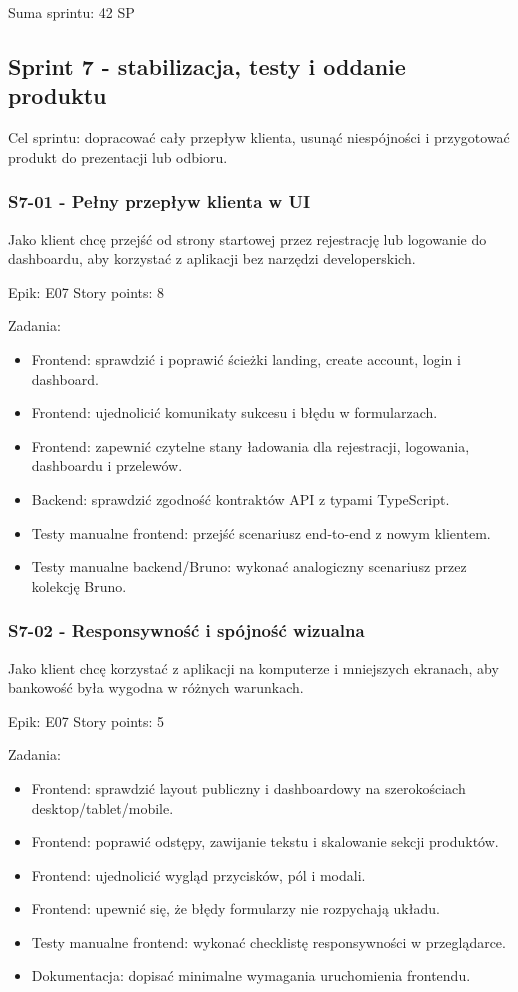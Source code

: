 \documentclass[12pt,a4paper]{article}
\begin{document}
Suma sprintu: 42 SP

\subsection*{Sprint 7 - stabilizacja, testy i oddanie produktu}

Cel sprintu: dopracować cały przepływ klienta, usunąć niespójności i przygotować produkt do prezentacji lub odbioru.

\subsubsection*{S7-01 - Pełny przepływ klienta w UI}

Jako klient chcę przejść od strony startowej przez rejestrację lub logowanie do dashboardu, aby korzystać z aplikacji bez narzędzi developerskich.

Epik: E07
Story points: 8

Zadania:

\begin{itemize}
\item Frontend: sprawdzić i poprawić ścieżki landing, create account, login i dashboard.
\item Frontend: ujednolicić komunikaty sukcesu i błędu w formularzach.
\item Frontend: zapewnić czytelne stany ładowania dla rejestracji, logowania, dashboardu i przelewów.
\item Backend: sprawdzić zgodność kontraktów API z typami TypeScript.
\item Testy manualne frontend: przejść scenariusz end-to-end z nowym klientem.
\item Testy manualne backend/Bruno: wykonać analogiczny scenariusz przez kolekcję Bruno.
\end{itemize}

\subsubsection*{S7-02 - Responsywność i spójność wizualna}

Jako klient chcę korzystać z aplikacji na komputerze i mniejszych ekranach, aby bankowość była wygodna w różnych warunkach.

Epik: E07
Story points: 5

Zadania:

\begin{itemize}
\item Frontend: sprawdzić layout publiczny i dashboardowy na szerokościach desktop/tablet/mobile.
\item Frontend: poprawić odstępy, zawijanie tekstu i skalowanie sekcji produktów.
\item Frontend: ujednolicić wygląd przycisków, pól i modali.
\item Frontend: upewnić się, że błędy formularzy nie rozpychają układu.
\item Testy manualne frontend: wykonać checklistę responsywności w przeglądarce.
\item Dokumentacja: dopisać minimalne wymagania uruchomienia frontendu.
\end{itemize}
\end{document}
